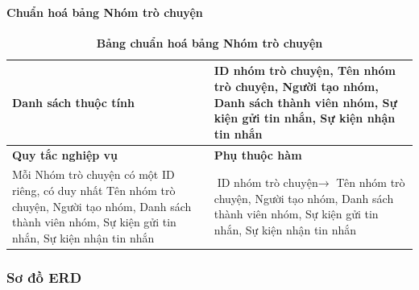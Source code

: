 \paragraph{Chuẩn hoá bảng Nhóm trò chuyện}
\mbox{}
\begin{table}[H]
	\caption{\bfseries \fontsize{12pt}{0pt}\selectfont Bảng chuẩn hoá bảng Nhóm trò chuyện}
	\centering
	\begin{tabularx}{0.9\textwidth}{|X|X|}
		\hline
		\textbf{Danh sách thuộc tính} & ID nhóm trò chuyện, Tên nhóm trò chuyện, Người tạo nhóm, Danh sách thành viên nhóm, Sự kiện gửi tin nhắn, Sự kiện nhận tin nhắn                                             \\
		\hline
		\textbf{Quy tắc nghiệp vụ}    & \textbf{Phụ thuộc hàm}                                                                                                                                                      \\
		\hline
		Mỗi Nhóm trò chuyện có một ID riêng, có duy nhất Tên nhóm trò chuyện, Người tạo nhóm, Danh sách thành viên nhóm, Sự kiện gửi tin nhắn, Sự kiện nhận tin nhắn
		                              & \parbox[t]{\linewidth}{$\text{ID nhóm trò chuyện} \rightarrow$ Tên nhóm trò chuyện, Người tạo nhóm, Danh sách thành viên nhóm, Sự kiện gửi tin nhắn, Sự kiện nhận tin nhắn} \\
		\hline
		                                                                                                                         \\
		                                                                                                                                    \\
		\hline
	\end{tabularx}
\end{table}

\subsubsection{Sơ đồ ERD}

